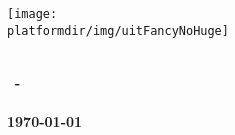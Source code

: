 \thispagestyle{empty}
\begin{center}
	\texttt{[image: \\platformdir/img/uitFancyNoHuge]} \\[1.0cm]
	\Large{\exerciseSetName\ \setNo} \\[1.5cm]
\end{center}
\begin{center}
\textbf{\courseCode\ - \courseTitle}\\[1cm]
\textbf{\large\versionText}
\textbf{\authorname} \\[1cm]
\textbf{\today} \\[3cm]
\end{center}



\begin{center}
\vfill
{} \\[0.5cm]
\textbf{\facultyname}
\end{center}
\newpage
